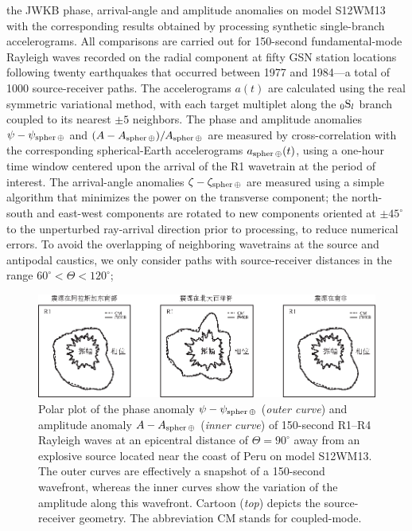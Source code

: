 the JWKB phase, arrival-angle and amplitude anomalies on model
S12WM13 with the corresponding results obtained by processing
synthetic single-branch accelerograms.  All comparisons are carried
out for 150-second fundamental-mode Rayleigh waves recorded on
the radial component at fifty GSN station locations following
twenty earthquakes that occurred between 1977 and 1984---a total
of 1000 source-receiver paths.
The accelerograms $a(t)$ are calculated using the real
symmetric variational method, with each target multiplet along
the ${}_0{\rm S}_l$ branch coupled to its nearest $\pm5$ neighbors.
The phase and amplitude anomalies $\psi-\psi_{\rm spher\,\oplus}$ and
$(A-A_{\rm spher\,\oplus})/A_{\rm spher\,\oplus}$
are measured by cross-correlation
with the corresponding spherical-Earth accelerograms
$a_{\rm spher\,\oplus}(t)$, using a one-hour time window centered upon the
arrival of the R1 wavetrain at the period of interest.
The arrival-angle anomalies $\zeta-\zeta_{\rm spher\,\oplus}$
are measured using a simple algorithm that minimizes the
power on the transverse component; the north-south and
east-west components are rotated to new components oriented
at $\pm45^{\circ}$ to the unperturbed ray-arrival direction
prior to processing, to reduce numerical errors.
To avoid the overlapping of neighboring wavetrains at
the source and antipodal caustics, we only consider paths
with source-receiver distances in the range $60^\circ<\Theta<120^\circ$;
\begin{figure}[!t]
\begin{center}
\includegraphics{../figures/chap16/fig12.eps}
\end{center}
\caption[JWKB_CM_ring1]{\label{fig:16.JWKB_CM_ring1}
Polar plot of the phase anomaly $\psi-\psi_{\rm spher\,\oplus}$
({\em outer curve\/}) and amplitude anomaly
$A-A_{\rm spher\,\oplus}$ ({\em inner curve\/}) of
150-second R1--R4 Rayleigh waves at an epicentral
distance of $\Theta=90^\circ$ away from an explosive
source located near the coast of Peru on model S12WM13.
The outer curves are effectively a snapshot of a
150-second wavefront, whereas the inner curves show
the variation of the amplitude along this wavefront.
Cartoon ({\em top\/}) depicts the source-receiver
geometry.  The abbreviation CM stands for coupled-mode.}
\end{figure}
